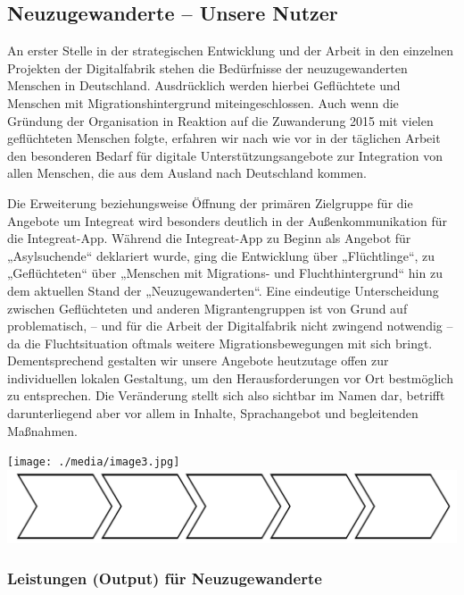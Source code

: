 \documentclass[12pt, a4paper]{article} %
\begin{document}
\hypertarget{neuzugewanderte-unsere-nutzer}{%
\subsection{Neuzugewanderte – Unsere
Nutzer}\label{neuzugewanderte-unsere-nutzer}}

An erster Stelle in der strategischen Entwicklung und der Arbeit in den
einzelnen Projekten der Digitalfabrik stehen die Bedürfnisse der
neuzugewanderten Menschen in Deutschland. Ausdrücklich werden hierbei
Geflüchtete und Menschen mit Migrationshintergrund miteingeschlossen.
Auch wenn die Gründung der Organisation in Reaktion auf die Zuwanderung
2015 mit vielen geflüchteten Menschen folgte, erfahren wir nach wie vor
in der täglichen Arbeit den besonderen Bedarf für digitale
Unterstützungsangebote zur Integration von allen Menschen, die aus dem
Ausland nach Deutschland kommen.

Die Erweiterung beziehungsweise Öffnung der primären Zielgruppe für die
Angebote um Integreat wird besonders deutlich in der Außenkommunikation
für die Integreat-App. Während die Integreat-App zu Beginn als Angebot
für „Asylsuchende“ deklariert wurde, ging die Entwicklung über
„Flüchtlinge“, zu „Geflüchteten“ über „Menschen mit Migrations- und
Fluchthintergrund“ hin zu dem aktuellen Stand der „Neuzugewanderten“.
Eine eindeutige Unterscheidung zwischen Geflüchteten und anderen
Migrantengruppen ist von Grund auf problematisch, – und für die Arbeit
der Digitalfabrik nicht zwingend notwendig – da die Fluchtsituation
oftmals weitere Migrationsbewegungen mit sich bringt. Dementsprechend
gestalten wir unsere Angebote heutzutage offen zur individuellen lokalen
Gestaltung, um den Herausforderungen vor Ort bestmöglich zu entsprechen.
Die Veränderung stellt sich also sichtbar im Namen dar, betrifft
darunterliegend aber vor allem in Inhalte, Sprachangebot und begleitenden Maßnahmen.

\begin{minipage}[t]{\textwidth}
    \texttt{[image: ./media/image3.jpg]}
    \includegraphics[width=5.79167in]{./media/image4.png}
\end{minipage}

\hypertarget{leistungen-output-fuxfcr-neuzugewanderte}{%
\subsubsection{Leistungen (Output) für
Neuzugewanderte}\label{leistungen-output-fuxfcr-neuzugewanderte}}
\end{document}
